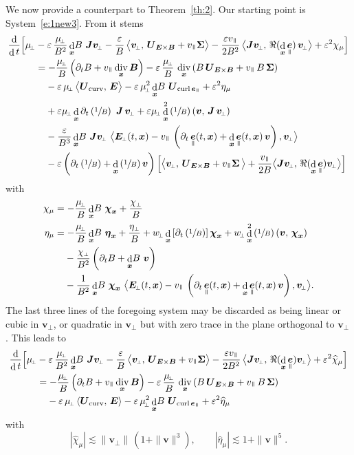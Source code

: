 \documentclass[JEP,XML,SOM,Unicode]{cedram}
\newcommand{\sperp}{{\scriptscriptstyle\perp}}
\newcommand{\blangle}{\bigl\langle}
\newcommand{\brangle}{\bigr\rangle}
\let\eps\varepsilon
\let\d\partial
\DeclareMathOperator\dD{d}\let\dd\dD
\DeclareMathOperator{\Div}{div}
\DeclareMathOperator{\Curl}{curl}
\theoremstyle{plain}
\theoremstyle{definition}
\newcommand\bB{{\boldsymbol B}}
\newcommand\bE{{\boldsymbol E}}
\newcommand\bJ{{\boldsymbol J}}
\newcommand\bU{{\boldsymbol U}}
\newcommand\bfv{{\boldsymbol v}}
\newcommand\bfx{{\boldsymbol x}}
\newcommand\bfeta{{\boldsymbol \eta}}
\newcommand\bfchi{{\boldsymbol \chi}}
\newcommand\Sig{{\boldsymbol \Sigma}}
\DeclareMathOperator{\beD}{\boldsymbol{e}}
\newcommand\eDpar{\beD_\mypar}
\newcommand\vpar{v_\mypar}
\newcommand\bvperp{\bfv_{\!\sperp}}
\newcommand\eperp{w_{\!\sperp}}
\newcommand\muperp{\mu_{\!\sperp}}
\newcommand\Eperp{\bE_{\!\sperp}}
\newcommand{\EcB}{\bU_{\bE\times\bB}}
\newcommand{\curvB}{\bU_{\mathrm{curv}}}
\newcommand{\rotB}{\bU_{\Curl\eDpar}}
\newcommand{\mypar}{{\mkern3mu\vphantom{\perp}\vrule depth 0pt\mkern2mu\vrule depth 0pt\mkern3mu}}
\begin{document}
We now provide a counterpart to Theorem~\ref{th:2}. Our starting point is System~\eqref{e:1new3}. From it stems
\begin{align*}
\frac{\dD }{\dD t}\Bigl[\muperp
&
-\eps\,\frac{\muperp}{B^2}\dD_\bfx\!B\ \bJ\bvperp
-\frac{\eps}{B}\, \blangle\bvperp,
\,\EcB+\vpar\Sig\brangle
- \frac{\eps\vpar}{2B^2}\, \blangle\bJ\bvperp,\,\Re(\dD_\bfx\eDpar)\,\bvperp\brangle
+\eps^2\chi_\mu
\Bigr]\\
&
=-\frac{\muperp}{B}\left(\d_tB+\vpar\Div_\bfx\bB\right)
-\eps\,\frac{\muperp}{B}\,\Div_\bfx\left(B\,\EcB+\vpar\,B\,\Sig\right)
\\
&\hphantom{={}}
-\eps\,\muperp\,\blangle\curvB,\,\bE\brangle
-\eps\,\muperp^2\dD_\bfx\!B\ \rotB
+\eps^2\eta_\mu\\
&\hphantom{={}}
+\eps\muperp\dD_\bfx\d_t\left(\sfrac1B\right)\ \bJ\,\bvperp
+\eps\muperp\dD_\bfx^2\left(\sfrac1B\right)\left(\bfv,\,\bJ\,\bvperp\right)\\
&\hphantom{={}}
-\frac{\eps}{B^3}\dD_\bfx\!B\ \bJ\bvperp\ \blangle \Eperp(t,\bfx) -\vpar\,\left(
\d_t\eDpar(t,\bfx)+\dD_{\bfx}\eDpar(t,\bfx)\,\bfv\right),\bvperp\brangle\\
&\hphantom{={}}
-\eps\left(\d_t\left(\sfrac1B\right)+\dD_\bfx\left(\sfrac1B\right)\bfv\right)
\Bigl[\blangle\bvperp,
\,\EcB+\vpar\Sig\,\brangle
+ \frac{\vpar}{2B} \blangle\bJ\bvperp,\,\Re(\dD_\bfx\eDpar)\bvperp\brangle\Bigr]
\end{align*}
with
\begin{align*}
\chi_\mu&
=-\frac{\muperp}{B}\dD_\bfx\!B\ \bfchi_\bfx
+\frac{\chi_\sperp}{B}\\
\eta_\mu&
=-\frac{\muperp}{B}\dD_\bfx\!B\ \bfeta_\bfx+\frac{\eta_\sperp}{B}
+\eperp\dD_\bfx\left[\d_t\left(\sfrac1B\right)\right]\bfchi_\bfx
+\eperp\dD_\bfx^2\left(\sfrac1B\right)\left(\bfv,\,\bfchi_\bfx\right) \\
&\hphantom{={}}
-\frac{\chi_\sperp}{B^2}\left(\d_tB+\dD_\bfx\!B\ \bfv\right)\\
&\hphantom{={}}
-\frac{1}{B^2}\dD_\bfx\!B\ \bfchi_\bfx\ \blangle \Eperp(t,\bfx) -\vpar\,\left(
\d_t\eDpar(t,\bfx)+\dD_{\bfx}\eDpar(t,\bfx)\,\bfv\right),\bvperp\brangle.
\end{align*}
The last three lines of the foregoing system may be discarded as being linear or cubic in $\bvperp$, or quadratic in $\bvperp$ but with zero trace in the plane orthogonal to $\bvperp$. This leads to
\begin{align*}
\frac{\dD }{\dD t}\Bigl[\muperp
&
-\eps\,\frac{\muperp}{B^2}\dD_\bfx\!B\ \bJ\bvperp
-\frac{\eps}{B}\, \blangle\bvperp,
\,\EcB+\vpar\Sig\brangle
- \frac{\eps\vpar}{2B^2}\, \blangle\bJ\bvperp,\,\Re(\dD_\bfx\eDpar)\bvperp\brangle
+\eps^2\widehat\chi_\mu
\Bigr]\\
&
=-\frac{\muperp}{B}\left(\d_tB+\vpar\Div_\bfx\bB\right)
-\eps\,\frac{\muperp}{B}\,\Div_\bfx\left(B\,\EcB+\vpar\,B\,\Sig\right)
\\
&\hphantom{={}}
-\eps\,\muperp\,\langle\curvB,\,\bE\rangle
-\eps\,\muperp^2\dD_\bfx\!B\ \rotB
+\eps^2\widehat\eta_\mu
\end{align*}
with
\[
|\widehat\chi_\mu|\lesssim \|\bvperp\|\,(1+\|\bfv\|^3),\qquad
|\widehat\eta_\mu|\lesssim 1+\|\bfv\|^5.
\]
\end{document}
